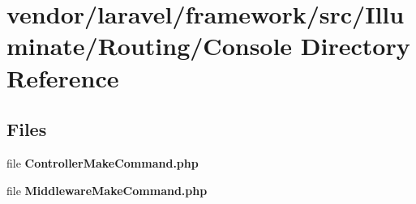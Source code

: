 \section{vendor/laravel/framework/src/\+Illuminate/\+Routing/\+Console Directory Reference}
\label{dir_9e436adae815467f090d8162ddc87032}
\subsection*{Files}
\begin{DoxyCompactItemize}
\item 
file {\bf Controller\+Make\+Command.\+php}
\item 
file {\bf Middleware\+Make\+Command.\+php}
\end{DoxyCompactItemize}
